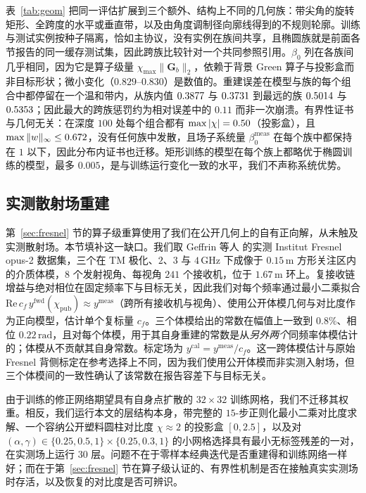 \documentclass[UTF8,a4paper,11pt]{ctexart}
\newcommand{\norm}[1]{\lVert #1 \rVert}
\newcommand{\numv}[1]{#1}
\begin{document}
表~\ref{tab:geom} 把同一评估扩展到三个额外、结构上不同的几何族：带尖角的旋转矩形、全跨度的水平或垂直带，以及由角度调制径向廓线得到的不规则轮廓。训练与测试实例按种子隔离，恰如主协议，没有实例在族间共享，且椭圆族就是前面各节报告的同一缓存测试集，因此跨族比较针对一个共同参照引用。$\beta_0$ 列在各族间几乎相同，因为它是算子级量 $\chi_{\max}\norm{\mathbf G_b}_2$，依赖于背景 Green 算子与投影盒而非目标形状；微小变化（$0.829$--$0.830$）是数值的。重建误差在模型与族的每个组合中都停留在一个温和带内，从族内值 $\numv{\NumRreRectRect}$ 与 $\numv{\NumRreEllEll}$ 到最远的族 $\numv{\NumRreRectBlob}$ 与 $\numv{\NumRreEllBlob}$；因此最大的跨族惩罚约为相对误差中的 $0.11$ 而非一次崩溃。有界性证书与几何无关：在深度 $100$ 处每个组合都有 $\max|\chi|=\numv{\NumMaxChiBox}$（投影盒），且 $\max\|w\|_\infty\le\numv{\NumMaxWGeomEll}$，没有任何族中发散，且场子系统量 $\beta_0^{\mathrm{meas}}$ 在每个族中都保持在 $1$ 以下，因此分布内证书也迁移。矩形训练的模型在每个族上都略优于椭圆训练的模型，最多 $0.005$，是与训练运行变化一致的水平，我们不声称系统优势。

\subsection{实测散射场重建}
\label{sec:fresnelrecon}

第~\ref{sec:fresnel} 节的算子级重算使用了我们在公开几何上的自有正向解，从未触及实测散射场。本节填补这一缺口。我们取 Geffrin 等人 \cite{fresnel_db} 的实测 Institut Fresnel opus-2 数据集，三个在 TM 极化、$2$、$3$ 与 $4\,\mathrm{GHz}$ 下成像于 $0.15\,\mathrm{m}$ 方形关注区内的介质体模，$8$ 个发射视角、每视角 $241$ 个接收机，位于 $1.67\,\mathrm{m}$ 环上。复接收链增益与绝对相位在固定频率下与目标无关，因此我们对每个频率通过最小二乘拟合 $\mathrm{Re}\,c_f\,y^{\mathrm{fwd}}(\chi_{\mathrm{pub}})\approx y^{\mathrm{meas}}$（跨所有接收机与视角）、使用公开体模几何与对比度作为正向模型，估计单个复标量 $c_f$。三个体模给出的常数在幅值上一致到 $0.8\%$、相位 $0.22\,\mathrm{rad}$，且对每个体模，用于其自身重建的常数是从\emph{另外两个}同频率体模估计的；体模从不贡献其自身常数。标定场为 $y^{\mathrm{cal}}=y^{\mathrm{meas}}/c_f$。这一跨体模估计与原始 Fresnel 背侧标定在参考选择上不同，因为我们使用公开体模而非实测入射场，但三个体模间的一致性确认了该常数在报告容差下与目标无关。

由于训练的修正网络期望具有自身点扩散的 $32\times32$ 训练网格，我们不迁移其权重。相反，我们运行本文的层结构本身，带完整的 $15$-步正则化最小二乘对比度求解、一个容纳公开塑料圆柱对比度 $\chi\approx2$ 的投影盒 $[0,2.5]$，以及对 $(\alpha,\gamma)\in\{0.25,0.5,1\}\times\{0.25,0.3,1\}$ 的小网格选择具有最小无标签残差的一对，在实测场上运行 $30$ 层。问题不在于零样本经典迭代是否重建得和训练网络一样好；而在于第~\ref{sec:fresnel} 节在算子级认证的、有界性机制是否在接触真实实测场时存活，以及恢复的对比度是否可辨识。
\end{document}
